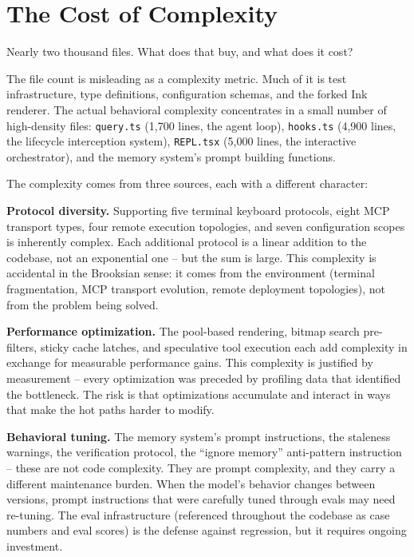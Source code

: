 \documentclass[
  english,
  11pt,
  letterpaper,
]{book}
\begin{document}
\section{The Cost of Complexity}\label{the-cost-of-complexity}

Nearly two thousand files. What does that buy, and what does it cost?

The file count is misleading as a complexity metric. Much of it is test
infrastructure, type definitions, configuration schemas, and the forked
Ink renderer. The actual behavioral complexity concentrates in a small
number of high-density files: \texttt{query.ts} (1,700 lines, the agent
loop), \texttt{hooks.ts} (4,900 lines, the lifecycle interception
system), \texttt{REPL.tsx} (5,000 lines, the interactive orchestrator),
and the memory system's prompt building functions.

The complexity comes from three sources, each with a different
character:

\textbf{Protocol diversity.} Supporting five terminal keyboard
protocols, eight MCP transport types, four remote execution topologies,
and seven configuration scopes is inherently complex. Each additional
protocol is a linear addition to the codebase, not an exponential one --
but the sum is large. This complexity is accidental in the Brooksian
sense: it comes from the environment (terminal fragmentation, MCP
transport evolution, remote deployment topologies), not from the problem
being solved.

\textbf{Performance optimization.} The pool-based rendering, bitmap
search pre-filters, sticky cache latches, and speculative tool execution
each add complexity in exchange for measurable performance gains. This
complexity is justified by measurement -- every optimization was
preceded by profiling data that identified the bottleneck. The risk is
that optimizations accumulate and interact in ways that make the hot
paths harder to modify.

\textbf{Behavioral tuning.} The memory system's prompt instructions, the
staleness warnings, the verification protocol, the ``ignore memory''
anti-pattern instruction -- these are not code complexity. They are
prompt complexity, and they carry a different maintenance burden. When
the model's behavior changes between versions, prompt instructions that
were carefully tuned through evals may need re-tuning. The eval
infrastructure (referenced throughout the codebase as case numbers and
eval scores) is the defense against regression, but it requires ongoing
investment.
\end{document}
